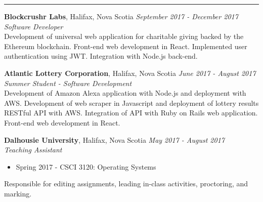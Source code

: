 \documentclass[letterpaper,10pt]{article}
\newenvironment{rsection}[1]{%
  \Needspace{5\baselineskip}\vspace{6pt}{\bfseries\MakeUppercase{#1}}\par\vspace{2pt}\hrule\vspace{4pt}
  \begin{list}{}{\setlength{\leftmargin}{1.5em}\setlength{\itemsep}{5pt}\setlength{\parsep}{0pt}\setlength{\topsep}{0pt}}
}{\end{list}}
\begin{document}
\begin{rsection}{Work Experience}
\item[] {\bfseries Blockcrushr Labs}, Halifax, Nova Scotia \hfill {\itshape September 2017 - December 2017}\\
  {\itshape Software Developer}\\
  Development of universal web application for charitable giving backed by the Ethereum blockchain. Front-end web development in React. Implemented user authentication using JWT. Integration with Node.js back-end.

\item[] {\bfseries Atlantic Lottery Corporation}, Halifax, Nova Scotia \hfill {\itshape June 2017 - August 2017}\\
  {\itshape Summer Student - Software Development}\\
  Development of Amazon Alexa application with Node.js and deployment with AWS. Development of web scraper in Javascript and deployment of lottery results RESTful API with AWS. Integration of API with Ruby on Rails web application. Front-end web development in React.

\item[] {\bfseries Dalhousie University}, Halifax, Nova Scotia \hfill {\itshape May 2017 - August 2017}\\
  {\itshape Teaching Assistant}
  \begin{itemize}
    \item Spring 2017 - CSCI 3120: Operating Systems
  \end{itemize}
  Responsible for editing assignments, leading in-class activities, proctoring, and marking.
\end{rsection}
\end{document}
